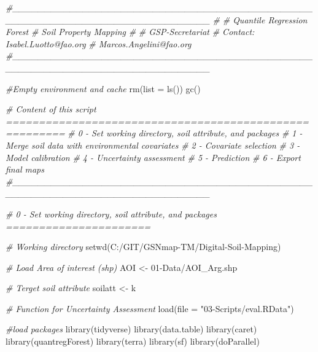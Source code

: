 \documentclass[
  10pt,
  b5paper,
  oneside]{book}
\newenvironment{Shaded}{\begin{snugshade}}{\end{snugshade}}
\newcommand{\AttributeTok}[1]{\textcolor[rgb]{0.77,0.63,0.00}{#1}}
\newcommand{\CommentTok}[1]{\textcolor[rgb]{0.56,0.35,0.01}{\textit{#1}}}
\newcommand{\FunctionTok}[1]{\textcolor[rgb]{0.00,0.00,0.00}{#1}}
\newcommand{\NormalTok}[1]{#1}
\newcommand{\OtherTok}[1]{\textcolor[rgb]{0.56,0.35,0.01}{#1}}
\newcommand{\StringTok}[1]{\textcolor[rgb]{0.31,0.60,0.02}{#1}}
\begin{document}
\begin{Shaded}
\begin{Highlighting}[]
\CommentTok{\#\_\_\_\_\_\_\_\_\_\_\_\_\_\_\_\_\_\_\_\_\_\_\_\_\_\_\_\_\_\_\_\_\_\_\_\_\_\_\_\_\_\_\_\_\_\_\_\_\_\_\_\_\_\_\_\_\_\_\_\_\_\_\_\_\_\_\_\_\_\_\_\_\_\_\_\_\_\_\_}
\CommentTok{\#}
\CommentTok{\# Quantile Regression Forest}
\CommentTok{\# Soil Property Mapping}
\CommentTok{\#}
\CommentTok{\# GSP{-}Secretariat}
\CommentTok{\# Contact: Isabel.Luotto@fao.org}
\CommentTok{\#          Marcos.Angelini@fao.org}
\CommentTok{\#\_\_\_\_\_\_\_\_\_\_\_\_\_\_\_\_\_\_\_\_\_\_\_\_\_\_\_\_\_\_\_\_\_\_\_\_\_\_\_\_\_\_\_\_\_\_\_\_\_\_\_\_\_\_\_\_\_\_\_\_\_\_\_\_\_\_\_\_\_\_\_\_\_\_\_\_\_\_\_}

\CommentTok{\#Empty environment and cache }
\FunctionTok{rm}\NormalTok{(}\AttributeTok{list =} \FunctionTok{ls}\NormalTok{())}
\FunctionTok{gc}\NormalTok{()}

\CommentTok{\# Content of this script =======================================================}
\CommentTok{\# 0 {-} Set working directory, soil attribute, and packages}
\CommentTok{\# 1 {-} Merge soil data with environmental covariates }
\CommentTok{\# 2 {-} Covariate selection}
\CommentTok{\# 3 {-} Model calibration}
\CommentTok{\# 4 {-} Uncertainty assessment}
\CommentTok{\# 5 {-} Prediction}
\CommentTok{\# 6 {-} Export final maps}
\CommentTok{\#\_\_\_\_\_\_\_\_\_\_\_\_\_\_\_\_\_\_\_\_\_\_\_\_\_\_\_\_\_\_\_\_\_\_\_\_\_\_\_\_\_\_\_\_\_\_\_\_\_\_\_\_\_\_\_\_\_\_\_\_\_\_\_\_\_\_\_\_\_\_\_\_\_\_\_\_\_\_\_}


\CommentTok{\# 0 {-} Set working directory, soil attribute, and packages ======================}

\CommentTok{\# Working directory}
\FunctionTok{setwd}\NormalTok{(}\StringTok{\textquotesingle{}C:/GIT/GSNmap{-}TM/Digital{-}Soil{-}Mapping\textquotesingle{}}\NormalTok{)}

\CommentTok{\# Load Area of interest (shp)}
\NormalTok{AOI }\OtherTok{\textless{}{-}} \StringTok{\textquotesingle{}01{-}Data/AOI\_Arg.shp\textquotesingle{}}

\CommentTok{\# Terget soil attribute}
\NormalTok{soilatt }\OtherTok{\textless{}{-}} \StringTok{\textquotesingle{}k\textquotesingle{}}

\CommentTok{\# Function for Uncertainty Assessment}
\FunctionTok{load}\NormalTok{(}\AttributeTok{file =} \StringTok{"03{-}Scripts/eval.RData"}\NormalTok{)}

\CommentTok{\#load packages}
\FunctionTok{library}\NormalTok{(tidyverse)}
\FunctionTok{library}\NormalTok{(data.table)}
\FunctionTok{library}\NormalTok{(caret)}
\FunctionTok{library}\NormalTok{(quantregForest)}
\FunctionTok{library}\NormalTok{(terra)}
\FunctionTok{library}\NormalTok{(sf)}
\FunctionTok{library}\NormalTok{(doParallel)}



\end{Highlighting}
\end{Shaded}
\end{document}
